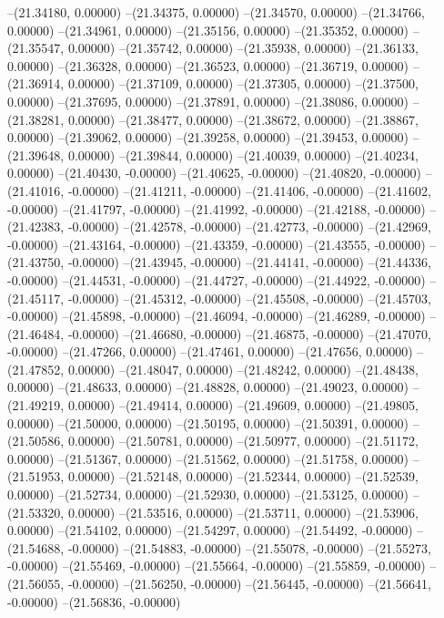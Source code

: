 --(21.34180, 0.00000)
--(21.34375, 0.00000)
--(21.34570, 0.00000)
--(21.34766, 0.00000)
--(21.34961, 0.00000)
--(21.35156, 0.00000)
--(21.35352, 0.00000)
--(21.35547, 0.00000)
--(21.35742, 0.00000)
--(21.35938, 0.00000)
--(21.36133, 0.00000)
--(21.36328, 0.00000)
--(21.36523, 0.00000)
--(21.36719, 0.00000)
--(21.36914, 0.00000)
--(21.37109, 0.00000)
--(21.37305, 0.00000)
--(21.37500, 0.00000)
--(21.37695, 0.00000)
--(21.37891, 0.00000)
--(21.38086, 0.00000)
--(21.38281, 0.00000)
--(21.38477, 0.00000)
--(21.38672, 0.00000)
--(21.38867, 0.00000)
--(21.39062, 0.00000)
--(21.39258, 0.00000)
--(21.39453, 0.00000)
--(21.39648, 0.00000)
--(21.39844, 0.00000)
--(21.40039, 0.00000)
--(21.40234, 0.00000)
--(21.40430, -0.00000)
--(21.40625, -0.00000)
--(21.40820, -0.00000)
--(21.41016, -0.00000)
--(21.41211, -0.00000)
--(21.41406, -0.00000)
--(21.41602, -0.00000)
--(21.41797, -0.00000)
--(21.41992, -0.00000)
--(21.42188, -0.00000)
--(21.42383, -0.00000)
--(21.42578, -0.00000)
--(21.42773, -0.00000)
--(21.42969, -0.00000)
--(21.43164, -0.00000)
--(21.43359, -0.00000)
--(21.43555, -0.00000)
--(21.43750, -0.00000)
--(21.43945, -0.00000)
--(21.44141, -0.00000)
--(21.44336, -0.00000)
--(21.44531, -0.00000)
--(21.44727, -0.00000)
--(21.44922, -0.00000)
--(21.45117, -0.00000)
--(21.45312, -0.00000)
--(21.45508, -0.00000)
--(21.45703, -0.00000)
--(21.45898, -0.00000)
--(21.46094, -0.00000)
--(21.46289, -0.00000)
--(21.46484, -0.00000)
--(21.46680, -0.00000)
--(21.46875, -0.00000)
--(21.47070, -0.00000)
--(21.47266, 0.00000)
--(21.47461, 0.00000)
--(21.47656, 0.00000)
--(21.47852, 0.00000)
--(21.48047, 0.00000)
--(21.48242, 0.00000)
--(21.48438, 0.00000)
--(21.48633, 0.00000)
--(21.48828, 0.00000)
--(21.49023, 0.00000)
--(21.49219, 0.00000)
--(21.49414, 0.00000)
--(21.49609, 0.00000)
--(21.49805, 0.00000)
--(21.50000, 0.00000)
--(21.50195, 0.00000)
--(21.50391, 0.00000)
--(21.50586, 0.00000)
--(21.50781, 0.00000)
--(21.50977, 0.00000)
--(21.51172, 0.00000)
--(21.51367, 0.00000)
--(21.51562, 0.00000)
--(21.51758, 0.00000)
--(21.51953, 0.00000)
--(21.52148, 0.00000)
--(21.52344, 0.00000)
--(21.52539, 0.00000)
--(21.52734, 0.00000)
--(21.52930, 0.00000)
--(21.53125, 0.00000)
--(21.53320, 0.00000)
--(21.53516, 0.00000)
--(21.53711, 0.00000)
--(21.53906, 0.00000)
--(21.54102, 0.00000)
--(21.54297, 0.00000)
--(21.54492, -0.00000)
--(21.54688, -0.00000)
--(21.54883, -0.00000)
--(21.55078, -0.00000)
--(21.55273, -0.00000)
--(21.55469, -0.00000)
--(21.55664, -0.00000)
--(21.55859, -0.00000)
--(21.56055, -0.00000)
--(21.56250, -0.00000)
--(21.56445, -0.00000)
--(21.56641, -0.00000)
--(21.56836, -0.00000)
